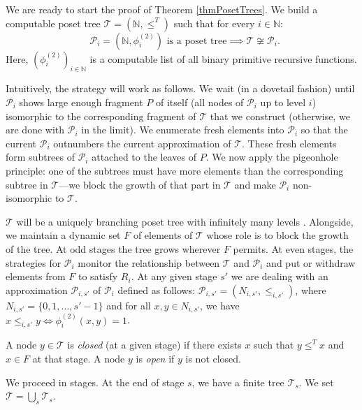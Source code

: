 \documentclass[a4paper,UKenglish,cleveref, autoref, thm-restate]{lipics-v2021}
\begin{document}
We are ready to start the proof of Theorem \ref{thmPosetTrees}. We build a computable poset tree $\mathcal T = (\mathbb N, \leq^T)$ such that for every $ i \in \mathbb N$: \begin{equation}\text{ $\mathcal P_i = (\mathbb N, \phi_i^{(2)})$ is a poset tree} \implies \mathcal T  \not\cong \mathcal P_i.\tag{$R_i$}\end{equation}
Here, $(\phi_i^{(2)})_{i\in\mathbb{N}}$ is a computable list of all binary primitive recursive functions. 

Intuitively, the strategy will work as follows. We wait (in a dovetail fashion) until $\mathcal P_i$ shows large enough fragment $P$ of itself (all nodes of $\mathcal P_i$ up to level $i$) isomorphic to the corresponding fragment of $\mathcal T$ that we construct (otherwise, we are done with $\mathcal P_i$ in the limit). We enumerate fresh elements into $\mathcal P_i$ so that the current $\mathcal P_i$ outnumbers the current approximation of $\mathcal T$. These fresh elements form subtrees of $\mathcal P_i$ attached to the leaves of $P$. We now apply the pigeonhole principle: one of the subtrees must have more elements than the corresponding subtree in $\mathcal T$---we block the growth of that part in $\mathcal T$ and make $\mathcal P_i$ non-isomorphic to $\mathcal T$. 


$\mathcal T$ will be a uniquely branching poset tree with infinitely many levels . Alongside, we maintain a dynamic set $F$ of elements of $\mathcal T$ whose role is to block the growth of the tree. At odd stages the tree grows wherever $F$ permits. At even stages, the strategies for $\mathcal P_i$ monitor the relationship between $\mathcal T$ and $\mathcal P_i$ and put or withdraw elements from $F$ to satisfy $R_i$. At any given stage $s'$ we are dealing with an approximation $\mathcal P_{i,s'}$ of $\mathcal P_{i}$ defined as follows: $\mathcal P_{i,s'} = (N_{i,s'}, \leq_{i,s'})$, where $N_{i,s'} = \{0,1,\dots, s'-1\}$ and for all $x,y \in N_{i,s'}$, we have $x \leq_{i,s'} y \Leftrightarrow \phi^{(2)}_i(x,y) = 1$.




          A node $y \in \mathcal T$ is \emph{closed} (at a given stage) if there exists $x$ such that $y \leq^T x$ and $x \in F$ at that stage. A node $y$ is \emph{open} if $y$ is not closed.



We proceed in stages. At the end of stage $s$, we have a finite tree $\mathcal T_s$. We set $\mathcal T = \bigcup_s \mathcal T_s$.
\end{document}
